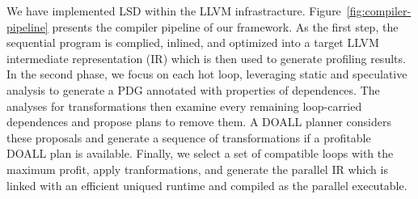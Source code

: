 We have implemented LSD within the LLVM infrastracture.
Figure~\ref{fig:compiler-pipeline} presents the compiler pipeline of our
framework. As the first step, the sequential program is complied, inlined,
and optimized into a target LLVM intermediate representation (IR) which is
then used to generate profiling results. In the second phase, we focus on
each hot loop, leveraging static and speculative analysis to generate a PDG
annotated with properties of dependences. The analyses for transformations
then examine every remaining loop-carried dependences and propose plans to
remove them. A DOALL planner considers these proposals and generate a
sequence of transformations if a profitable DOALL plan is available.
Finally, we select a set of compatible loops with the maximum profit, apply
tranformations, and generate the parallel IR which is linked with an
efficient uniqued runtime and compiled as the parallel executable.
